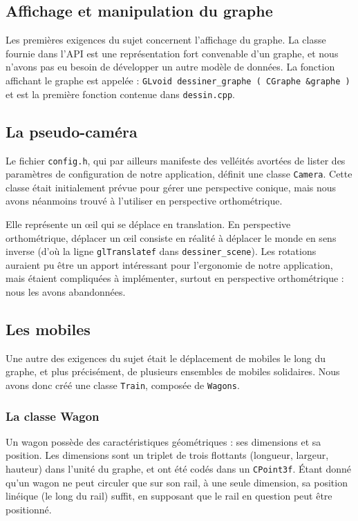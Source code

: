 \documentclass[a4paper, oneside, 11pt, twocolumn]{article}
\begin{document}
\subsection[Affichage du graphe]{Affichage et manipulation du graphe}

Les premières exigences du sujet concernent l'affichage du graphe. La classe fournie dans l'API est une représentation fort convenable d'un graphe, et nous n'avons pas eu besoin de développer un autre modèle de données. La fonction affichant le graphe est appelée : \texttt{GLvoid dessiner\_graphe ( CGraphe \&graphe )} et est la première fonction contenue dans \texttt{dessin.cpp}.

\subsection{La pseudo-caméra}

Le fichier \texttt{config.h}, qui par ailleurs manifeste des velléités avortées de lister des paramètres de configuration de notre application, définit une classe \texttt{Camera}. Cette classe était initialement prévue pour gérer une perspective conique, mais nous avons néanmoins trouvé à l'utiliser en perspective orthométrique.

Elle représente un œil qui se déplace en translation. En perspective orthométrique, déplacer un œil consiste en réalité à déplacer le monde en sens inverse (d'où la ligne \texttt{glTranslatef} dans \texttt{dessiner\_scene}). Les rotations auraient pu être un apport intéressant pour l'ergonomie de notre application, mais étaient compliquées à implémenter, surtout en perspective orthométrique : nous les avons abandonnées.

\subsection{Les mobiles}

Une autre des exigences du sujet était le déplacement de mobiles le long du graphe, et plus précisément, de plusieurs ensembles de mobiles solidaires. Nous avons donc créé une classe \texttt{Train}, composée de \texttt{Wagons}.

\subsubsection{La classe Wagon}

Un wagon possède des caractéristiques géométriques : ses dimensions et sa position. Les dimensions sont un triplet de trois flottants (longueur, largeur, hauteur) dans l'unité du graphe, et ont été codés dans un \texttt{CPoint3f}. Étant donné qu'un wagon ne peut circuler que sur son rail, à une seule dimension, sa position linéique (le long du rail) suffit, en supposant que le rail en question peut être positionné.
\end{document}
